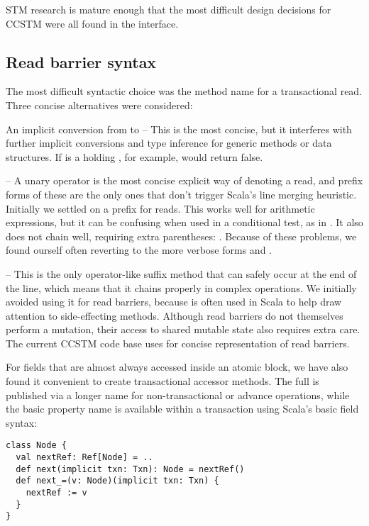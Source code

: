 
STM research is mature enough that the most difficult design decisions
for CCSTM were all found in the interface.

\subsection{Read barrier syntax}
\label{sec:syntax}

The most difficult syntactic choice was the method name for a
transactional read.  Three concise alternatives were considered:

\begin{packed_enum}

\item An implicit conversion from  to  -- This is
the most concise, but it interferes with further implicit conversions and type
inference for generic methods or data structures.  If  is a
 holding , for example, 
would return false.

\item {} -- A unary operator is the most concise explicit
way of denoting a read, and prefix forms of these are the only ones
that don't trigger Scala's line merging heuristic.  Initially we
settled on a \code{!} prefix for reads.  This works well for arithmetic
expressions, but it can be confusing when used in a conditional test,
as in .  It also does not chain well, requiring
extra parentheses: .  Because of these problems, we
found ourself often reverting to the more verbose forms  and .

\item {} -- This is the only operator-like suffix method
that can safely occur at the end of the line, which means that it chains
properly in complex operations.  We initially avoided using it for read
barriers, because \code{()} is often used in Scala to help draw attention
to side-effecting methods.  Although read barriers do not themselves
perform a mutation, their access to shared mutable state also requires
extra care.  The current CCSTM code base uses  for concise
representation of read barriers.

\end{packed_enum}

For fields that are almost always accessed inside an atomic block, we
have also found it convenient to create transactional accessor methods.
The full  is published via a longer name for non-transactional
or advance operations, while the basic property name is available within
a transaction using Scala's basic field syntax:
\lstset{numbers=none}
\lstset{xleftmargin=0.125in}
\begin{lstlisting}
class Node {
  val nextRef: Ref[Node] = ..
  def next(implicit txn: Txn): Node = nextRef()
  def next_=(v: Node)(implicit txn: Txn) {
    nextRef := v 
  }
}
\end{lstlisting}
\lstset{xleftmargin=0.25in}
\lstset{numbers=left}

